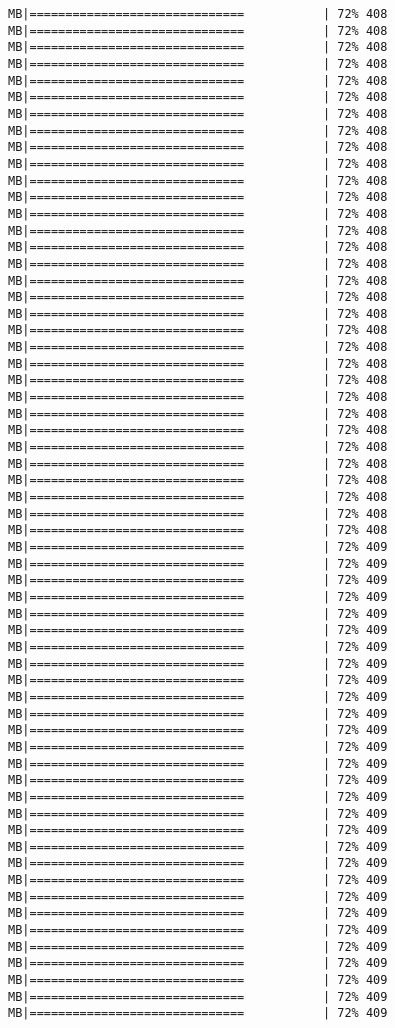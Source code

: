 \documentclass[
]{article}
\begin{document}
\begin{verbatim}
MB|==============================           | 72% 408 MB|==============================           | 72% 408 MB|==============================           | 72% 408 MB|==============================           | 72% 408 MB|==============================           | 72% 408 MB|==============================           | 72% 408 MB|==============================           | 72% 408 MB|==============================           | 72% 408 MB|==============================           | 72% 408 MB|==============================           | 72% 408 MB|==============================           | 72% 408 MB|==============================           | 72% 408 MB|==============================           | 72% 408 MB|==============================           | 72% 408 MB|==============================           | 72% 408 MB|==============================           | 72% 408 MB|==============================           | 72% 408 MB|==============================           | 72% 408 MB|==============================           | 72% 408 MB|==============================           | 72% 408 MB|==============================           | 72% 408 MB|==============================           | 72% 408 MB|==============================           | 72% 408 MB|==============================           | 72% 408 MB|==============================           | 72% 408 MB|==============================           | 72% 408 MB|==============================           | 72% 408 MB|==============================           | 72% 408 MB|==============================           | 72% 408 MB|==============================           | 72% 408 MB|==============================           | 72% 408 MB|==============================           | 72% 408 MB|==============================           | 72% 409 MB|==============================           | 72% 409 MB|==============================           | 72% 409 MB|==============================           | 72% 409 MB|==============================           | 72% 409 MB|==============================           | 72% 409 MB|==============================           | 72% 409 MB|==============================           | 72% 409 MB|==============================           | 72% 409 MB|==============================           | 72% 409 MB|==============================           | 72% 409 MB|==============================           | 72% 409 MB|==============================           | 72% 409 MB|==============================           | 72% 409 MB|==============================           | 72% 409 MB|==============================           | 72% 409 MB|==============================           | 72% 409 MB|==============================           | 72% 409 MB|==============================           | 72% 409 MB|==============================           | 72% 409 MB|==============================           | 72% 409 MB|==============================           | 72% 409 MB|==============================           | 72% 409 MB|==============================           | 72% 409 MB|==============================           | 72% 409 MB|==============================           | 72% 409 MB|==============================           | 72% 409 MB|==============================           | 72% 409 MB|==============================           | 72% 409 
\end{verbatim}
\end{document}
